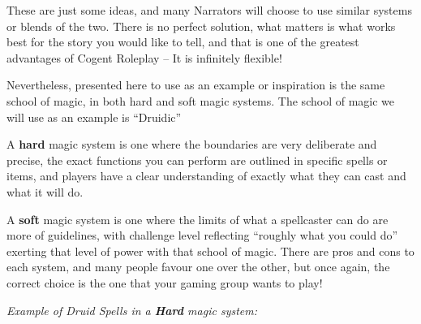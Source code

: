 These are just some ideas, and many Narrators will choose to use similar systems or blends of the two. There is no perfect solution, what matters is what works best for the story you would like to tell, and that is one of the greatest advantages of Cogent Roleplay – It is infinitely flexible!

Nevertheless, presented here to use as an example or inspiration is the same school of magic, in both hard and soft magic systems. The school of magic we will use as an example is “Druidic”

A \textbf{hard} magic system is one where the boundaries are very deliberate and precise, the exact functions you can perform are outlined in specific spells or items, and players have a clear understanding of exactly what they can cast and what it will do.

A \textbf{soft} magic system is one where the limits of what a spellcaster can do are more of guidelines, with challenge level reflecting “roughly what you could do” exerting that level of power with that school of magic. There are pros and cons to each system, and many people favour one over the other, but once again, the correct choice is the one that your gaming group wants to play!

\textit{Example of Druid Spells in a \textbf{Hard} magic system:}

